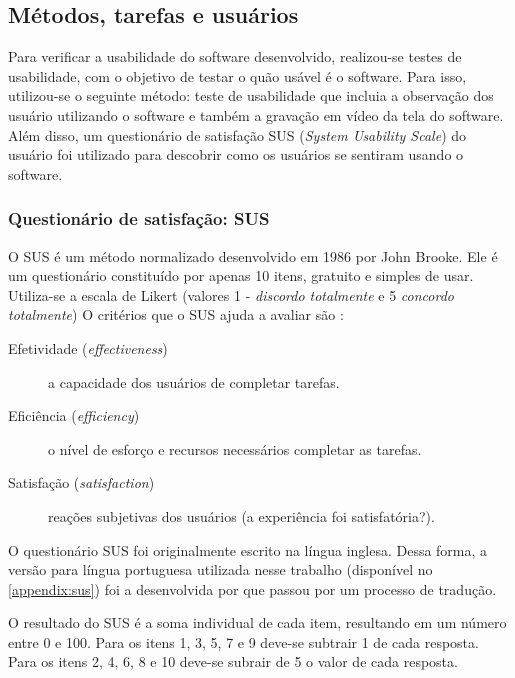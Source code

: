 \subsection{Métodos, tarefas e usuários}

Para verificar a usabilidade do software desenvolvido, realizou-se testes de usabilidade, com o
objetivo de testar o quão usável é o software. Para isso, utilizou-se o seguinte método: teste de usabilidade
que incluia a observação dos usuário utilizando o software e também a gravação em vídeo da tela do
software. Além disso, um questionário de satisfação SUS (\textit{System Usability Scale}) do usuário foi utilizado para descobrir como
os usuários se sentiram usando o software.

\subsubsection{Questionário de satisfação: SUS}\label{sub:sus}

O SUS é um método normalizado desenvolvido em 1986 por John Brooke.
Ele é um questionário constituído por apenas 10 itens, gratuito e simples de usar.
Utiliza-se a escala de Likert (valores 1 - \textit{discordo totalmente} e 5 \textit{concordo totalmente})
O critérios que o SUS ajuda a avaliar são \cite{brooke1996sus}:

\begin{description}
  \item[Efetividade (\textit{effectiveness})] a capacidade dos usuários de completar tarefas.
  \item[Eficiência (\textit{efficiency})] o nível de esforço e recursos necessários completar as tarefas.
  \item[Satisfação (\textit{satisfaction})] reações subjetivas dos usuários (a experiência foi satisfatória?).
\end{description}

O questionário SUS foi originalmente escrito na língua inglesa. Dessa forma, a versão para língua portuguesa
utilizada nesse trabalho (disponível no \autoref{appendix:sus}) foi a desenvolvida por  que passou por um processo
de tradução.

O resultado do SUS é a soma individual de cada item, resultando em um número entre 0 e 100.
Para os itens 1, 3, 5, 7 e 9 deve-se subtrair 1 de cada resposta. Para os itens 2, 4, 6, 8 e 10 deve-se
subrair de 5 o valor de cada resposta.

